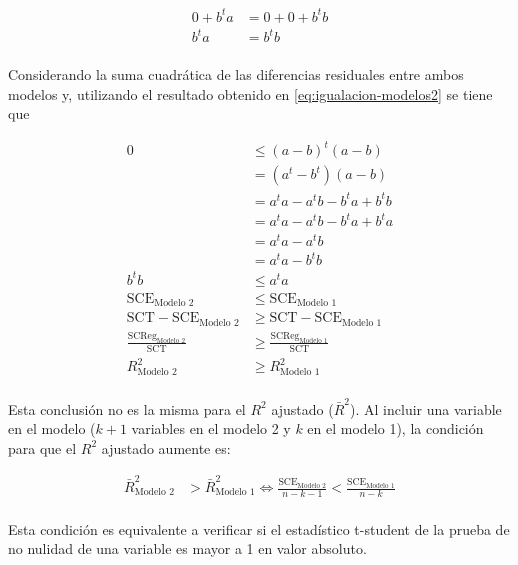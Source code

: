 \documentclass[
  11pt,
]{book}
\theoremstyle{definition}
\theoremstyle{definition}
\theoremstyle{definition}
\theoremstyle{definition}
\theoremstyle{remark}
\begin{document}
\begin{equation}
\begin{split}
0 + b^ta &= 0 + 0 + b^tb\\
b^ta &=b^tb\\
\end{split}
\label{eq:igualacion-modelos2}
\end{equation}

Considerando la suma cuadrática de las diferencias residuales entre ambos modelos y, utilizando el resultado obtenido en \eqref{eq:igualacion-modelos2} se tiene que

\begin{equation}
\begin{split}
0 &\leq (a-b)^t(a-b)\\
&= (a^t-b^t)(a-b)\\
&= a^ta - a^tb - b^ta + b^tb\\
&= a^ta - a^tb - b^ta + b^ta\\
&= a^ta - a^tb\\
&= a^ta - b^tb\\
b^tb &\leq a^ta\\
\text{SCE}_{\text{Modelo 2}} &\leq \text{SCE}_{\text{Modelo 1}}\\
\text{SCT} - \text{SCE}_{\text{Modelo 2}} &\geq \text{SCT} - \text{SCE}_{\text{Modelo 1}}\\
\frac{\text{SCReg}_{\text{Modelo 2}}}{\text{SCT}} &\geq \frac{\text{SCReg}_{\text{Modelo 1}}}{\text{SCT}}\\
R^2_{\text{Modelo 2}} &\geq R^2_{\text{Modelo 1}}\\
\end{split}
\label{eq:igualacion-modelos3}
\end{equation}

Esta conclusión no es la misma para el \(R^2\) ajustado (\(\bar{R}^2\)). Al incluir una variable en el modelo (\(k+1\) variables en el modelo 2 y \(k\) en el modelo 1), la condición para que el \(R^2\) ajustado aumente es:

\begin{equation}
\begin{split}
\bar{R}^2_{\text{Modelo 2}} &> \bar{R}^2_{\text{Modelo 1}} \Leftrightarrow \frac{\text{SCE}_{\text{Modelo 2}}}{n-k-1} < \frac{\text{SCE}_{\text{Modelo 1}}}{n-k}\\
\end{split}
\label{eq:igualacion-modelos4}
\end{equation}

Esta condición es equivalente a verificar si el estadístico t-student de la prueba de no nulidad de una variable es mayor a 1 en valor absoluto.
\end{document}
